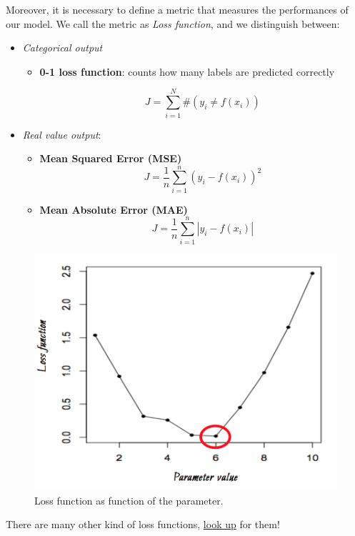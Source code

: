 Moreover, it is necessary to define a metric that measures the performances of our model. We call the metric as \emph{Loss function}, and we distinguish between:
\begin{itemize}
\item \emph{Categorical output}
\begin{itemize}
\item \textbf{0-1 loss function}: counts how many labels are predicted correctly

$$J = \sum_{i=1}^{N} \#(y_i \neq f(x_i))$$
\end{itemize}
\item \emph{Real value output}: 

\begin{itemize}
\item \textbf{Mean Squared Error (MSE)}
$$J = \frac{1}{n}\sum_{i=1}^{n} (y_i -  f(x_i))^2$$
\item \textbf{Mean Absolute Error (MAE)}
$$J = \frac{1}{n}\sum_{i=1}^{n} |y_i -  f(x_i)|$$
\end{itemize}

\end{itemize}

\begin{figure}[H]%
 \centering
 \includegraphics[width=13cm]{./img/08/loss_parameter}
 \caption{\label{pic:loss_parameter} Loss function as function of the parameter.}
\end{figure}

There are many other kind of loss functions, \href{https://en.wikipedia.org/wiki/Loss_function}{look up} for them!

